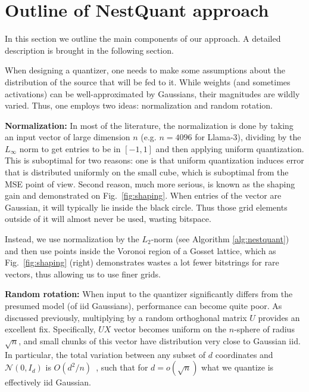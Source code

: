\documentclass{article}
\def\calN{\mathcal{N}}
\theoremstyle{plain}
\theoremstyle{definition}
\theoremstyle{remark}
\begin{document}
\fi
\section{Outline of NestQuant approach}\label{sec:outline}

In this section we outline the main components of our approach. A detailed description is brought in the following section.

When designing a quantizer, one needs to make some assumptions about the distribution of the source that will be fed to it. While weights (and sometimes activations) can be well-approximated by Gaussians, their magnitudes are wildly varied. Thus, one employs two ideas: normalization and random rotation. 


\textbf{Normalization:}
In most of the literature, the normalization is done by taking an input vector of large dimension $n$ (e.g. $n=4096$ for Llama-3), dividing by the $L_\infty$ norm to get entries to be in $[-1,1]$ and then applying uniform quantization. This is suboptimal for two reasons: one is that uniform quantization induces error that is distributed uniformly on the small cube, which is suboptimal from the MSE point of view. Second reason, much more serious, is known as the shaping gain and demonstrated on Fig.~\ref{fig:shaping}. When entries of the vector are Gaussian, it will typically lie inside the black circle. Thus those grid elements outside of it will almost never be used, wasting bitspace. 

Instead, we use normalization by the $L_2$-norm (see Algorithm \ref{alg:nestquant}) and then use points inside the Voronoi region of a Gosset lattice, which as Fig.~\ref{fig:shaping} (right) demonstrates wastes a lot fewer bitstrings for rare vectors, thus allowing us to use finer grids.

\textbf{Random rotation:} 
When input to the quantizer significantly differs from the presumed model (of iid Gaussians), performance can become quite poor. As discussed previously, multiplying by a random orthoghonal matrix $U$ provides an excellent fix. Specifically, $UX$ vector becomes uniform on the $n$-sphere of radius $\sqrt{n}$, and small chunks of this vector have distribution very close to Gaussian iid. In particular, the total variation between any subset of $d$ coordinates and $\calN(0, I_d)$ is $O(d^2/n)$~\cite{stam1982limit}, such that for $d=o(\sqrt{n})$ what we quantize is effectively iid Gaussian.
\end{document}
